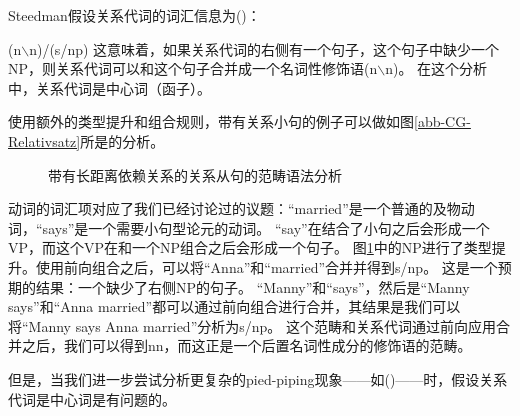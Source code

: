 Steedman假设关系代词的词汇信息为()：

\ea
\label{le-Relativpronomen-CG}
(n$\backslash$n)/(s/np)
\z
这意味着，如果关系代词的右侧有一个句子，这个句子中缺少一个NP，则关系代词可以和这个句子合并成一个名词性修饰语(n$\backslash$n)。
在这个分析中，关系代词是中心词（函子）。

使用额外的类型提升和组合规则，带有关系小句的例子可以做如图\vref{abb-CG-Relativsatz}所是的分析。
%
\begin{figure}
\centerline{%
}
\caption{\label{abb-CG-Relativsatz}带有长距离依赖关系的关系从句的范畴语法分析}
\end{figure}%
%
动词的词汇项对应了我们已经讨论过的议题：``{married}''是一个普通的及物动词，``{says}''是一个需要小句型论元的动词。
``say''在结合了小句之后会形成一个VP，而这个VP在和一个NP组合之后会形成一个句子。
图\ref{abb-CG-Relativsatz}中的NP进行了类型提升。使用前向组合之后，可以将``{Anna}''和``{married}''合并并得到s/np。
这是一个预期的结果：一个缺少了右侧NP的句子。
``Manny''和``{says}''，然后是``{Manny says}''和``{Anna married}''都可以通过前向组合进行合并，其结果是我们可以将``{Manny says Anna married}''分析为s/np。
这个范畴和关系代词通过前向应用合并之后，我们可以得到n\bs n，而这正是一个后置名词性成分的修饰语的范畴。

但是，当我们进一步尝试分析更复杂的pied-piping现象——如()——时，假设关系代词是中心词是有问题的。

